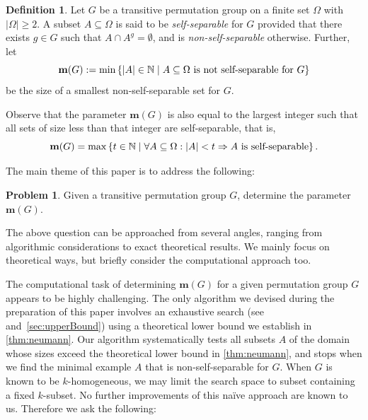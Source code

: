 \documentclass[a4paper]{amsart}
\newcommand{\m}{\mathbf{m}}
\newcommand{\act}{\,\rotatebox[origin=c]{-180}{$\circlearrowright$}\,}
\theoremstyle{definition}
\newtheorem{de}[theorem]{Definition}
\newtheorem{question}[thmx]{Problem}
\begin{document}
\begin{de}
\label{def:main}
Let $G$ be a transitive permutation group on a finite set $\Omega$ with $|\Omega| \ge 2$. 
A subset $A\subseteq \Omega$ is said to be \emph{self-separable} for $G$ provided that there exists $g\in G$ such that $A\cap A^g = \emptyset$, and is {\em non-self-separable} otherwise. Further, let 
\[ \m(G) :=  \min \left\{ |A| \in \mathbb{N} \mid A\subseteq \Omega \hbox{ is not self-separable for }G \right\}\]
be the size of a smallest non-self-separable set for $G$.
\end{de}
Observe that the parameter $\m(G)$ is also equal to the largest integer such that all sets of size less than that integer are self-separable, that is,
\[ \m(G) = \max \left\{ t \in \mathbb{N} \mid \forall A \subseteq \Omega : |A|< t  \Rightarrow A \hbox{ is self-separable} \right\}.\]

The main theme of this paper is to address the following:
\begin{question}\label{prob:0}
Given a transitive permutation group $G$, determine the parameter $\m(G)$.
\end{question}
The above question can be approached from several angles, ranging from algorithmic considerations to exact theoretical results. We mainly focus on theoretical ways, but briefly consider the computational approach too. 


The computational task of determining $\m(G)$ for a given permutation group $G$ appears to be highly challenging. The only algorithm we devised during the preparation of this paper involves an exhaustive search (see~\cite{ourAlgorithm} and~\cref{sec:upperBound}) using a theoretical lower bound we establish in \cref{thm:neumann}. Our algorithm systematically tests all subsets $A$ of the domain whose sizes exceed the theoretical lower bound in \cref{thm:neumann}, and stops when we find the minimal example $A$ that is non-self-separable for $G$. When $G$ is known to be $k$-homogeneous, we may limit the search space to subset containing a fixed $k$-subset. No further improvements of this naïve approach are known to us. Therefore we ask the following:
\end{document}
